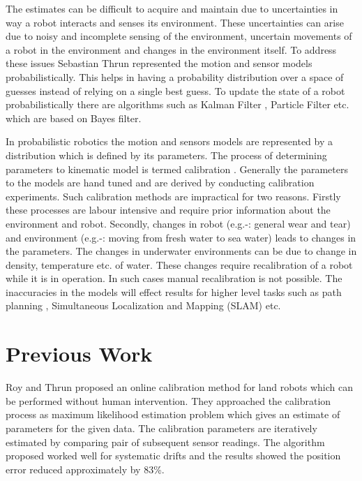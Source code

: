 \documentclass[12pt]{dalcsthesis}
\begin{document}
The estimates can be difficult to acquire and maintain due to uncertainties in way a robot interacts and senses its environment. These uncertainties can arise due to noisy and incomplete sensing of the environment, uncertain movements of a robot in the environment and changes in the environment itself.  To address these issues Sebastian Thrun \cite{thrun2005probabilistic} represented the motion and sensor models probabilistically. This helps in having a probability distribution over a space of guesses instead of relying on a single best guess. To update the state of a robot probabilistically there are algorithms such as Kalman Filter \cite{kalman1960new}, Particle Filter \cite{gordon1993novel} etc. which are based on Bayes filter. 

In probabilistic robotics the motion and sensors models are represented by a distribution which is defined by its parameters.  The process of determining parameters to kinematic model is termed calibration \cite{cox1990autonomous} \cite{vukobratovic1989introduction}. Generally the parameters to the models are hand tuned and are derived by conducting calibration experiments. Such calibration methods are impractical for two reasons. Firstly these processes are labour intensive and require prior information about the environment and robot. Secondly, changes in robot (e.g.-:  general wear and tear) and environment (e.g.-: moving from fresh water to sea water) leads to changes in the parameters. The changes in underwater environments can be due to change in density, temperature etc. of water. These changes require recalibration of a robot while it is in operation. In such cases manual recalibration is not possible. The inaccuracies in the models will effect results for higher level tasks such as path planning \cite{Lav06}, Simultaneous Localization and 
Mapping (SLAM) \cite{thrun2005probabilistic} \cite{grisettiyz2005improving} etc.

\section{Previous Work}
Roy and Thrun \cite{Roy} proposed an online calibration method for land robots which can be performed without human intervention.  They approached the calibration process as maximum likelihood estimation problem which gives an estimate of parameters for the given data. The calibration parameters are iteratively estimated by comparing pair of subsequent sensor readings. The algorithm proposed worked well for systematic drifts and the results showed the position error reduced approximately by 83\%.
\end{document}
